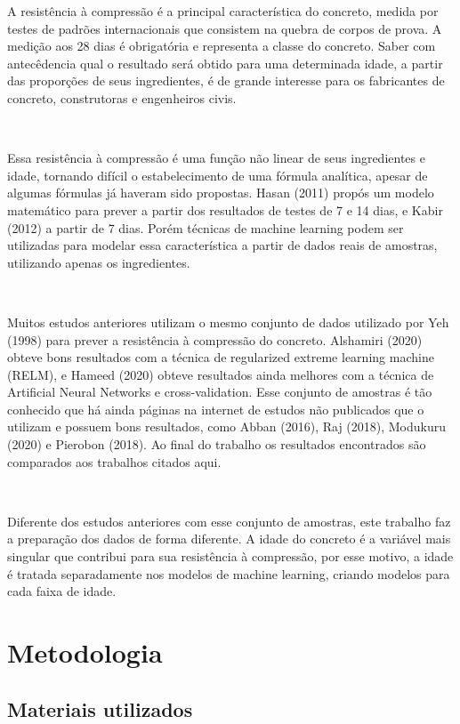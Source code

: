 \documentclass[]{article}
\begin{document}
A resistência à compressão é a principal característica do concreto,
medida por testes de padrões internacionais que consistem na quebra de
corpos de prova. A medição aos 28 dias é obrigatória e representa a
classe do concreto. Saber com antecêdencia qual o resultado será obtido
para uma determinada idade, a partir das proporções de seus
ingredientes, é de grande interesse para os fabricantes de concreto,
construtoras e engenheiros civis.

~

Essa resistência à compressão é uma função não linear de seus
ingredientes e idade, tornando difícil o estabelecimento de uma fórmula
analítica, apesar de algumas fórmulas já haveram sido propostas. Hasan
(2011) propós um modelo matemático para prever a partir dos resultados
de testes de 7 e 14 dias, e Kabir (2012) a partir de 7 dias. Porém
técnicas de machine learning podem ser utilizadas para modelar essa
característica a partir de dados reais de amostras, utilizando apenas os
ingredientes.

~

Muitos estudos anteriores utilizam o mesmo conjunto de dados utilizado
por Yeh (1998) para prever a resistência à compressão do concreto.
Alshamiri (2020) obteve bons resultados com a técnica de regularized
extreme learning machine (RELM), e Hameed (2020) obteve resultados ainda
melhores com a técnica de Artificial Neural Networks e cross-validation.
Esse conjunto de amostras é tão conhecido que há ainda páginas na
internet de estudos não publicados que o utilizam e possuem bons
resultados, como Abban (2016), Raj (2018), Modukuru (2020) e Pierobon
(2018). Ao final do trabalho os resultados encontrados são comparados
aos trabalhos citados aqui.

~

Diferente dos estudos anteriores com esse conjunto de amostras, este
trabalho faz a preparação dos dados de forma diferente. A idade do
concreto é a variável mais singular que contribui para sua resistência à
compressão, por esse motivo, a idade é tratada separadamente nos modelos
de machine learning, criando modelos para cada faixa de idade.

\hypertarget{metodologia}{%
\section{Metodologia}\label{metodologia}}

\hypertarget{materiais-utilizados}{%
\subsection{Materiais utilizados}\label{materiais-utilizados}}
\end{document}
